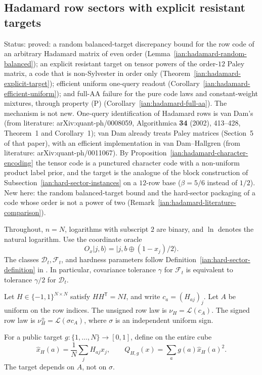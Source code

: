 \subsection{Hadamard row sectors with explicit resistant targets}\label{ian:hadamard-code-sectors}
Status: proved: a random balanced-target discrepancy bound for the row code of an arbitrary Hadamard matrix of even order (Lemma~\ref{ian:hadamard-random-balanced}); an explicit resistant target on tensor powers of the order-\(12\) Paley matrix, a code that is non-Sylvester in order only (Theorem~\ref{ian:hadamard-explicit-target}); efficient uniform one-query readout (Corollary~\ref{ian:hadamard-efficient-uniform}); and full-AA failure for the pure code laws and constant-weight mixtures, through property (P) (Corollary~\ref{ian:hadamard-full-aa}). The mechanism is not new. One-query identification of Hadamard rows is van Dam's (from literature: arXiv:quant-ph/0008059, Algorithmica \textbf{34} (2002), 413--428, Theorem~1 and Corollary~1); van Dam already treats Paley matrices (Section~5 of that paper), with an efficient implementation in van Dam--Hallgren (from literature: arXiv:quant-ph/0011067). By Proposition~\ref{ian:hadamard-character-encoding} the tensor code is a punctured character code with a non-uniform product label prior, and the target is the analogue of the block construction of Subsection~\ref{ian:hard-sector-instances} on a \(12\)-row base (\(\beta=5/6\) instead of \(1/2\)). New here: the random balanced-target bound and the hard-sector packaging of a code whose order is not a power of two (Remark~\ref{ian:hadamard-literature-comparison}).

Throughout, \(n=N\), logarithms with subscript \(2\) are binary, and \(\ln\) denotes the natural logarithm. Use the coordinate oracle
\[
 O_x|j,b\rangle
 =|j,b\oplus(1-x_j)/2\rangle .
\]
The classes \(\mathcal D_t,\mathcal F_t\), and hardness parameters follow
Definition~\ref{ian:hard-sector-definition} in
.
In particular, covariance tolerance \(\gamma\) for \(\mathcal F_t\) is equivalent to tolerance \(\gamma/2\) for \(\mathcal D_t\).

\begin{definition}
\label{ian:hadamard-row-law}
Let \(H\in\{-1,1\}^{N\times N}\) satisfy \(HH^{\mathsf T}=NI\), and write \(c_a=(H_{aj})_j\). Let \(A\) be uniform on the row indices. The unsigned row law is \(\nu_H=\mathcal L(c_A)\). The signed row law is \(\nu_H^\pm=\mathcal L(\sigma c_A)\), where \(\sigma\) is an independent uniform sign.

For a public target \(g:\{1,\ldots,N\}\to[0,1]\), define on the entire cube
\[
 \widehat x_H(a)=\frac1N\sum_jH_{aj}x_j,
 \qquad
 Q_{H,g}(x)=\sum_a g(a)\widehat x_H(a)^2 .
 \tag{34.1}\label{ian:hadamard-global-acceptance}
\]
The target depends on \(A\), not on \(\sigma\).
\end{definition}


